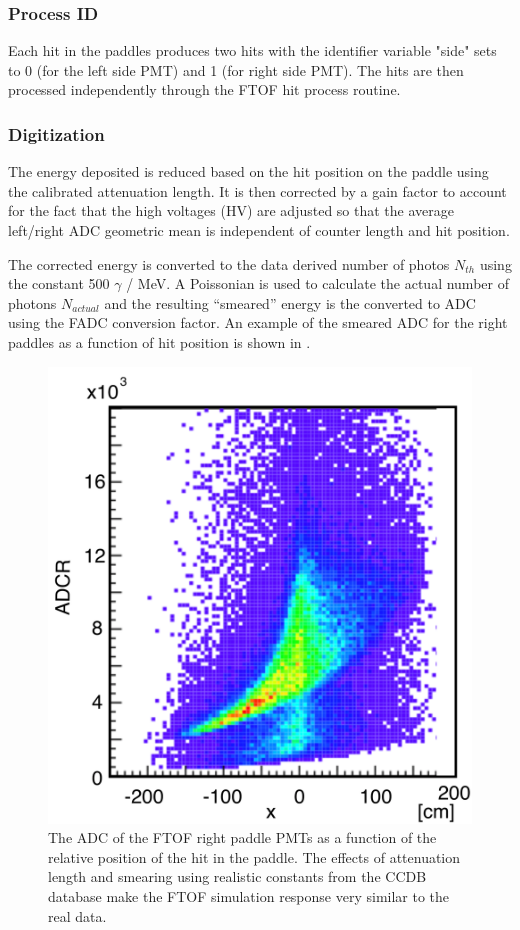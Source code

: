 \subsubsection{Process ID}

Each hit in the paddles produces two hits with the identifier variable "side" sets to 0 (for the left side PMT) and 1 (for right side PMT).
The hits are then processed independently through the FTOF hit process routine.

\subsubsection{Digitization}

The energy deposited is reduced based on the hit position on the paddle using the calibrated attenuation length. It is then corrected by a gain factor
to account for the fact that the high voltages (HV) are adjusted so that
the average left/right ADC geometric mean is independent of counter length and hit position.

The corrected energy is converted to the data derived number of photos $N_{th}$ using the constant 500 $\gamma$ / MeV. A Poissonian is used to
calculate the actual number of photons $N_{actual}$ and the resulting ``smeared'' energy is the converted to ADC using the FADC conversion factor.
An example of the smeared ADC for the right paddles as a function of hit position is shown in .

\begin{figure}
	\centering
	\includegraphics[width=0.99\columnwidth,keepaspectratio]{img/ftofAtten.png}
	\caption{The ADC of the FTOF right paddle PMTs as a function of the relative position of the hit in the paddle. The effects of attenuation
				length and smearing using realistic constants from the CCDB database make the FTOF simulation response very similar to the real data.}
	\label{fig:ftofAtten}
\end{figure}

